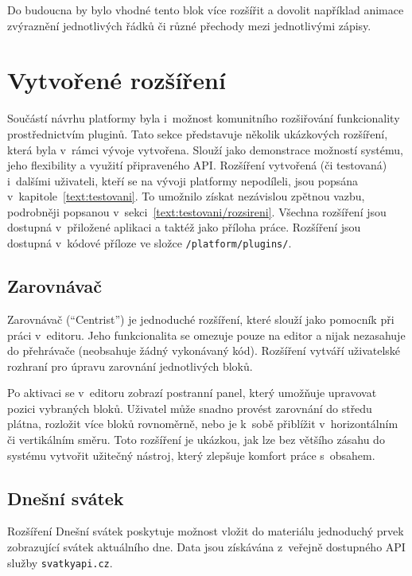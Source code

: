 Do budoucna by bylo vhodné tento blok více rozšířit a dovolit například animace zvýraznění jednotlivých řádků či různé přechody mezi jednotlivými zápisy.

\section{Vytvořené rozšíření}\label{text:realizace/vytvoreneRozsireni}

Součástí návrhu platformy byla i~možnost komunitního rozšiřování funkcionality prostřednictvím pluginů. 
Tato sekce představuje několik ukázkových rozšíření, která byla v~rámci vývoje vytvořena. 
Slouží jako demonstrace možností systému, jeho flexibility a využití připraveného API. 
Rozšíření vytvořená (či testovaná) i~dalšími uživateli, kteří se na vývoji platformy nepodíleli, jsou popsána v~kapitole~\ref{text:testovani}.
To umožnilo získat nezávislou zpětnou vazbu, podrobněji popsanou v~sekci~\ref{text:testovani/rozsireni}. 
Všechna rozšíření jsou dostupná v~přiložené aplikaci a taktéž jako příloha práce.
Rozšíření jsou dostupná v~kódové příloze ve složce \verb|/platform/plugins/|.

\subsection{Zarovnávač}

Zarovnávač (\enquote{Centrist}) je jednoduché rozšíření, které slouží jako pomocník při práci v~editoru.
Jeho funkcionalita se omezuje pouze na editor a nijak nezasahuje do přehrávače (neobsahuje žádný vykonávaný kód).
Rozšíření vytváří uživatelské rozhraní pro úpravu zarovnání jednotlivých bloků.

Po aktivaci se v~editoru zobrazí postranní panel, který umožňuje upravovat pozici vybraných bloků. 
Uživatel může snadno provést zarovnání do středu plátna, rozložit více bloků rovnoměrně, nebo je k~sobě přiblížit v~horizontálním či vertikálním směru. 
Toto rozšíření je ukázkou, jak lze bez většího zásahu do systému vytvořit užitečný nástroj, který zlepšuje komfort práce s~obsahem.

\subsection{Dnešní svátek}

Rozšíření Dnešní svátek poskytuje možnost vložit do materiálu jednoduchý prvek zobrazující svátek aktuálního dne. 
Data jsou získávána z~veřejně dostupného API služby \texttt{svatkyapi.cz}.

